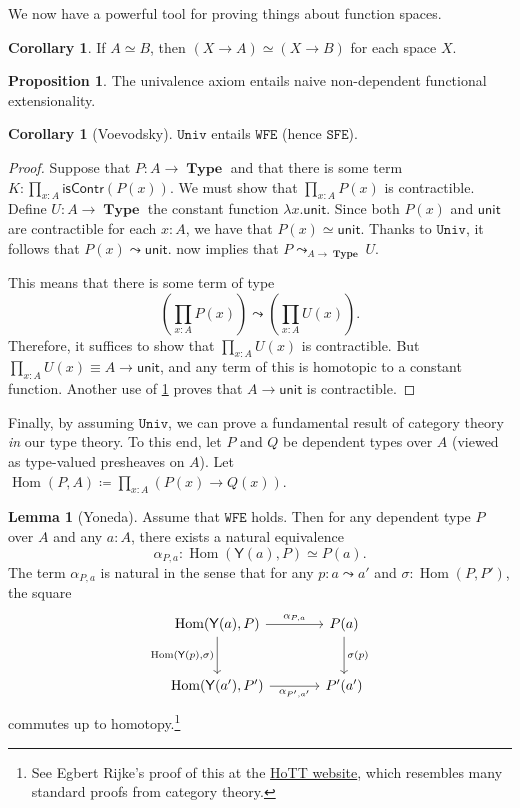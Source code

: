 \documentclass[10pt,letterpaper,cm]{nupset}
\theoremstyle{definition}
\theoremstyle{theorem}
\newtheorem{lemma}[definition]{Lemma}
\newtheorem{prop}[definition]{Proposition}
\newtheorem{corollary}[definition]{Corollary}
\theoremstyle{remark}
\newcommand{\1}{\mathbf{1}}
\newcommand{\wfe}{\mathtt{WFE}}
\newcommand{\sfe}{\mathtt{SFE}}
\newcommand{\univ}{\mathtt{Univ}}
\newcommand{\0}{\vec 0}
\DeclareMathOperator{\Hom}{Hom}
\DeclareMathOperator{\type}{\mathbf{Type}}
\begin{document}
We now have a powerful tool for proving things about function spaces.

\begin{corollary}
If $A \simeq B$, then $\left(X \to A\right) \simeq \left(X \to B\right)$ for each space $X$.
\end{corollary}

\begin{prop}\label{PP}
The univalence axiom entails naive non-dependent functional extensionality. 
\end{prop}

\begin{corollary}[Voevodsky]
$\univ$ entails $\wfe$ (hence $\sfe$).
\end{corollary}
\begin{proof}
Suppose that $P: A \to \type$ and that there is some term $K: \prod_{x:A}\mathsf{isContr}(P(x))$. We must show that $\prod_{x:A} P(x)$ is contractible.  Define $U: A \to \type$ the constant function $\lambda x. \mathsf{unit}$. Since both $P(x)$ and $ \mathsf{unit}$ are contractible for each $x:A$, we have that $P(x) \simeq  \mathsf{unit}$. Thanks to $\univ$, it follows that $P(x) \leadsto  \mathsf{unit}$.   now implies that $P\leadsto_{A \to \type} U$.

\smallskip

 This means that there is some term of type $$  \left(\prod_{x:A} P(x) \right) \leadsto \left(\prod_{x:A} U(x) \right)  .$$ Therefore, it suffices to show that $\prod_{x:A}U(x)$ is contractible.  But $\prod_{x:A}U(x) \equiv A \to \mathsf{unit}$, and any term of this is homotopic to a constant function. Another use of \cref{PP} proves that $A \to \mathsf{unit}$ is contractible. 
\end{proof}

Finally, by assuming $\univ$, we can prove a fundamental result of category theory \emph{in} our type theory. To this end, let $P$ and $Q$ be dependent types over $A$ (viewed as type-valued presheaves on $A$). Let $\Hom(P, A) \coloneqq \prod_{x:A}\left(P(x) \to Q(x)\right)$.


\begin{lemma}[Yoneda]
Assume that $\wfe$ holds. Then for any dependent type $P$ over $A$ and any $a: A$, there exists a natural equivalence $$ \alpha_{P,a} :\Hom(\mathsf{Y}(a), P)\simeq P(a) . $$ The term $ \alpha_{P,a} $ is natural in the sense that for any $p: a\leadsto a'$ and $\sigma : \Hom(P, P')$, the square
\[
\begin{tikzcd}[column sep=large, row sep=large]
{\Hom(\mathsf{Y}(a), P)} \arrow[r, "{\alpha_{P,a}}"] \arrow[d, "{\Hom(\mathsf{Y}(p), \sigma)}"'] & P(a) \arrow[d, "\sigma(p)"] \\
{\Hom(\mathsf{Y}(a'), P')} \arrow[r, "{\alpha_{P', a'}}"'] & P'(a')
\end{tikzcd}\] commutes up to homotopy.\footnote{See Egbert Rijke's proof of this at the \href{https://homotopytypetheory.org/2012/05/02/a-type-theoretical-yoneda-lemma/}{HoTT website}, which resembles many standard proofs from category theory.}
\end{lemma}
\end{document}
